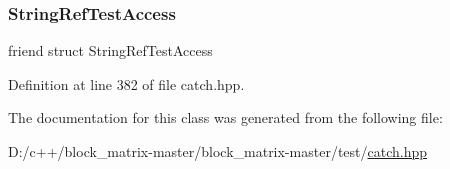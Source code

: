 \subsubsection{\texorpdfstring{String\+Ref\+Test\+Access}{StringRefTestAccess}}
{\footnotesize\ttfamily friend struct String\+Ref\+Test\+Access\hspace{0.3cm}{\ttfamily [friend]}}



Definition at line 382 of file catch.\+hpp.



The documentation for this class was generated from the following file\+:\begin{DoxyCompactItemize}
\item 
D\+:/c++/block\+\_\+matrix-\/master/block\+\_\+matrix-\/master/test/\mbox{\hyperlink{catch_8hpp}{catch.\+hpp}}\end{DoxyCompactItemize}
